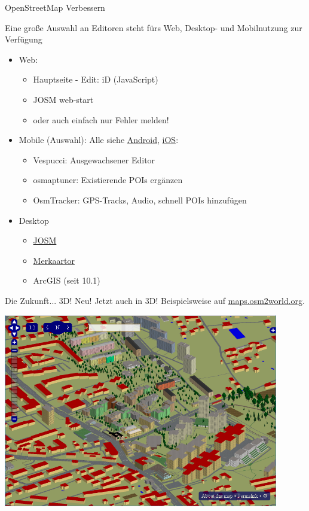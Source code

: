 \documentclass{beamer}
\begin{document}
\begin{frame}{OpenStreetMap Verbessern}

  Eine große Auswahl an Editoren steht fürs Web, Desktop- und Mobilnutzung zur Verfügung

  \begin{itemize}
    \item Web:
    \begin{itemize}
	    \item Hauptseite - Edit: iD (JavaScript)
      \item JOSM web-start
      \item oder auch einfach nur Fehler melden!
	      \pause
    \end{itemize}
    \item Mobile (Auswahl): Alle siehe  \href{http://wiki.openstreetmap.org/wiki/Android\#OpenStreetMap\_editing\_features}{Android}, \href{http://wiki.openstreetmap.org/wiki/Apple\_iOS\#OpenStreetMap\_editing\_features}{iOS}:
    \begin{itemize}
      \item Vespucci: Ausgewachsener Editor
      \item osmaptuner: Existierende POIs ergänzen
      \item OsmTracker: GPS-Tracks, Audio, schnell POIs hinzufügen
    \end{itemize}
  \item Desktop
    \begin{itemize}
      \item \href{http://josm.openstreetmap.de}{JOSM}
      \item \href{http://merkaartor.be}{Merkaartor}
      \item ArcGIS (seit 10.1)
    \end{itemize}
  \end{itemize}

\end{frame}

\begin{frame}{Die Zukunft... 3D! }
  Neu! Jetzt auch in 3D! Beispielsweise auf \href{http://maps.osm2world.org/?zoom=17&lat=47.06156&lon=15.46983&layers=BF0FTFFF}{maps.osm2world.org}.

  \includegraphics[width=0.9\textwidth]{3d.png}


\end{frame}
\end{document}
